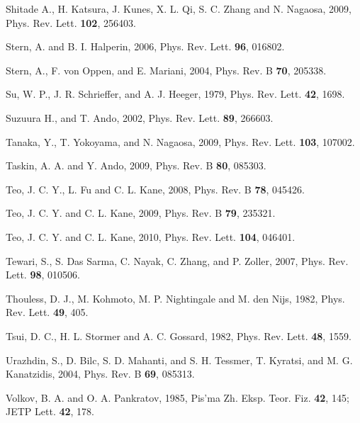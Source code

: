 \documentclass[twocolumn,floatfix,showpacs,rmp,aps]{revtex4}
\begin{document}
\begin{thebibliography}{99}
		Shitade A., H. Katsura, J. Kunes, X. L. Qi, S. C. Zhang and N. Nagaosa, 2009,
		Phys. Rev. Lett. {\bf 102}, 256403.
		
		Stern, A. and B. I. Halperin, 2006,
		Phys. Rev. Lett. {\bf 96}, 016802.
		
		Stern, A., F. von Oppen, and E. Mariani, 2004,
		Phys. Rev. B {\bf 70}, 205338.
		
		Su, W. P., J. R. Schrieffer, and A. J. Heeger, 1979,
		Phys. Rev. Lett. {\bf 42}, 1698.
		
		Suzuura H., and T. Ando, 2002,
		Phys. Rev. Lett. {\bf 89}, 266603.
		
		Tanaka, Y., T. Yokoyama, and N. Nagaosa, 2009,
		Phys. Rev. Lett. {\bf 103}, 107002.
		
		Taskin, A. A. and Y. Ando, 2009,
		Phys. Rev. B {\bf 80}, 085303.
		
		Teo, J. C. Y., L. Fu and C. L. Kane, 2008,
		Phys. Rev. B {\bf 78}, 045426.
		
		Teo, J. C. Y. and C. L. Kane, 2009,
		Phys. Rev. B {\bf 79}, 235321.
		
		Teo, J. C. Y. and C. L. Kane, 2010,
		Phys. Rev. Lett. {\bf 104}, 046401.
		
		Tewari, S., S. Das Sarma, C. Nayak, C. Zhang, and P. Zoller, 2007,
		Phys. Rev. Lett. {\bf 98}, 010506.
		
		Thouless, D. J., M. Kohmoto, M. P. Nightingale and M. den Nijs, 1982,
		Phys. Rev. Lett. {\bf 49}, 405.
		
		Tsui, D. C., H. L. Stormer and A. C. Gossard, 1982,
		Phys. Rev. Lett. {\bf 48}, 1559.
		
		Urazhdin, S., D. Bilc, S. D. Mahanti, and S. H. Tessmer, T. Kyratsi, and M. G.
		Kanatzidis, 2004,
		Phys. Rev. B {\bf 69}, 085313.
		
		Volkov, B. A. and O. A. Pankratov, 1985,
		Pis'ma Zh. Eksp. Teor. Fiz. {\bf 42}, 145; JETP Lett. {\bf 42}, 178.
		

\end{thebibliography}
\end{document}
